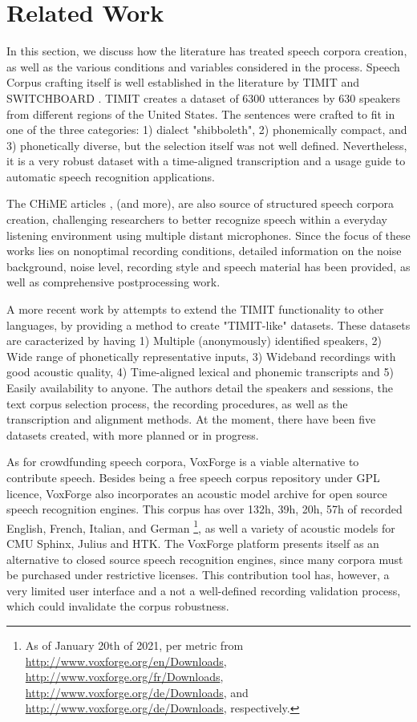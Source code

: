 \chapter[Related Work]{Related Work}

In this section, we discuss how the literature has treated speech corpora creation, as well as the various conditions and variables considered in the process. Speech Corpus crafting itself is well established in the literature by TIMIT \cite{Lamel1992timmit} and SWITCHBOARD \cite{godfrey1992switchboard}. TIMIT creates a dataset of 6300 utterances by 630 speakers from different regions of the United States. The sentences were crafted to fit in one of the three categories: 1) dialect "shibboleth", 2) phonemically compact, and 3) phonetically diverse, but the selection itself was not well defined. Nevertheless, it is a very robust dataset with a time-aligned transcription and a usage guide to automatic speech recognition applications.

The CHiME articles \cite{christensen2010chime} \cite{barker2013pascal}, \cite{barker2018fifth} (and more), are also source of structured speech corpora creation, challenging researchers to better recognize speech within a everyday listening environment using multiple distant microphones. Since the focus of these works lies on nonoptimal recording conditions, detailed information on the noise background, noise level, recording style and speech material has been provided, as well as comprehensive postprocessing work.

A more recent work by \cite{chanchaochai2018globaltimit} attempts to extend the TIMIT functionality to other languages, by providing a method to create "TIMIT-like" datasets. These datasets are caracterized by having 1) Multiple (anonymously) identified speakers, 2) Wide range of phonetically representative inputs, 3) Wideband recordings with good acoustic quality, 4) Time-aligned lexical and phonemic transcripts and 5) Easily availability to anyone. The authors detail the speakers and sessions, the text corpus selection process, the recording procedures, as well as the transcription and alignment methods. At the moment, there have been five datasets created, with more planned or in progress.

As for crowdfunding speech corpora, VoxForge \cite{voxforge} is a viable alternative to contribute speech. Besides being a free speech corpus repository under GPL licence, VoxForge also incorporates an acoustic model archive for open source speech recognition engines. This corpus has over 132h, 39h, 20h, 57h of recorded English, French, Italian, and German \footnote{As of January 20th of 2021, per metric from \url{http://www.voxforge.org/en/Downloads}, \url{http://www.voxforge.org/fr/Downloads}, \url{http://www.voxforge.org/de/Downloads}, and \url{http://www.voxforge.org/de/Downloads}, respectively.}, as well a variety of acoustic models for CMU Sphinx, Julius and HTK. The VoxForge platform presents itself as an alternative to closed source speech recognition engines, since many corpora must be purchased under restrictive licenses. This contribution tool has, however, a very limited user interface and a not a well-defined recording validation process, which could invalidate the corpus robustness.

